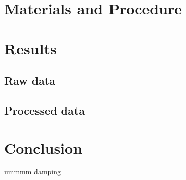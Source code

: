 \documentclass{article}
\begin{document}
\section{Materials and Procedure}


\section{Results}
\subsection{Raw data}
\subsection{Processed data}

\section{Conclusion}
ummmm damping
\end{document}
